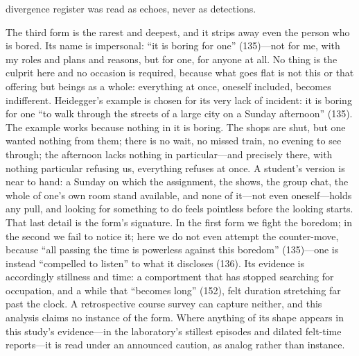 divergence register was read as echoes, never as detections.

The third form is the rarest and deepest, and it strips away even the
person who is bored. Its name is impersonal: ``it is boring for one''
(135)---not for me, with my roles and plans and reasons, but for one,
for anyone at all. No thing is the culprit here and no occasion is
required, because what goes flat is not this or that offering but
beings as a whole: everything at once, oneself included, becomes
indifferent. Heidegger's example is chosen for its very lack of
incident: it is boring for one ``to walk through the streets of a
large city on a Sunday afternoon'' (135). The example works because
nothing in it is boring. The shops are shut, but one wanted nothing
from them; there is no wait, no missed train, no evening to see
through; the afternoon lacks nothing in particular---and precisely
there, with nothing particular refusing us, everything refuses at
once. A student's version is near to hand: a Sunday on which the
assignment, the shows, the group chat, the whole of one's own room
stand available, and none of it---not even oneself---holds any pull,
and looking for something to do feels pointless before the looking
starts. That last detail is the form's signature. In the first form we
fight the boredom; in the second we fail to notice it; here we do not
even attempt the counter-move, because ``all passing the time is
powerless against this boredom'' (135)---one is instead ``compelled to
listen'' to what it discloses (136). Its evidence is accordingly
stillness and time: a comportment that has stopped searching for
occupation, and a while that ``becomes long'' (152), felt duration
stretching far past the clock. A retrospective course survey can
capture neither, and this analysis claims no instance of the form.
Where anything of its shape appears in this study's evidence---in the
laboratory's stillest episodes and dilated felt-time reports---it is
read under an announced caution, as analog rather than instance.

